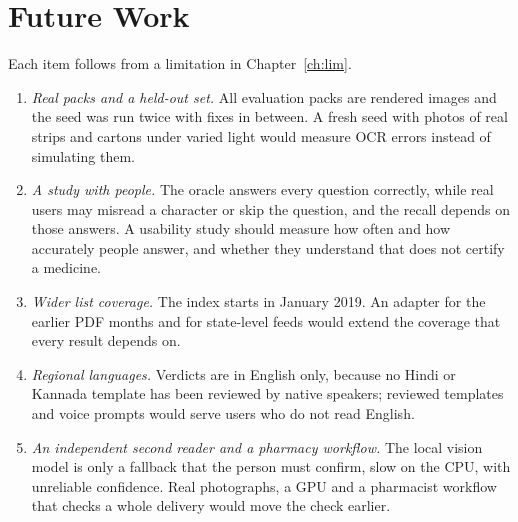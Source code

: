 \section{Future Work}
\label{sec:concl-future-work}

Each item follows from a limitation in Chapter~\ref{ch:lim}.
\begin{enumerate}[itemsep=2pt]
\item \emph{Real packs and a held-out set.} All evaluation packs are rendered images and the
seed was run twice with fixes in between. A fresh seed with photos of real strips and
cartons under varied light would measure OCR errors instead of simulating them.
\item \emph{A study with people.} The oracle answers every question correctly, while real users may
misread a character or skip the question, and the recall depends on those answers. A usability
study should measure how often and how accurately people answer, and whether they understand that
\NLISTED{} does not certify a medicine.
\item \emph{Wider list coverage.} The index starts in January 2019. An adapter for the earlier PDF
months and for state-level feeds would extend the coverage that every \NLISTED{} result depends on.
\item \emph{Regional languages.} Verdicts are in English only, because no Hindi or Kannada template has been
reviewed by native speakers; reviewed templates and voice prompts would serve users who do not read English.
\item \emph{An independent second reader and a pharmacy workflow.} The local vision model is
only a fallback that the person must confirm, slow on the CPU, with unreliable confidence. Real photographs, a GPU and
a pharmacist workflow that checks a whole delivery would move the check earlier.
\end{enumerate}
